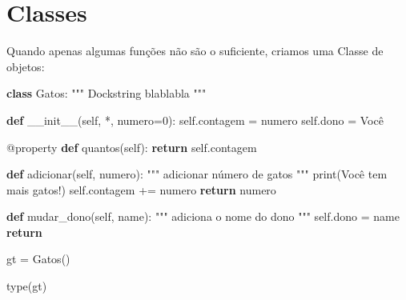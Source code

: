 \documentclass[
  letterpaper,
  DIV=11,
  numbers=noendperiod]{scrreprt}
\newenvironment{Shaded}{\begin{snugshade}}{\end{snugshade}}
\newcommand{\AttributeTok}[1]{\textcolor[rgb]{0.40,0.45,0.13}{#1}}
\newcommand{\BuiltInTok}[1]{\textcolor[rgb]{0.00,0.23,0.31}{#1}}
\newcommand{\CommentTok}[1]{\textcolor[rgb]{0.37,0.37,0.37}{#1}}
\newcommand{\ControlFlowTok}[1]{\textcolor[rgb]{0.00,0.23,0.31}{\textbf{#1}}}
\newcommand{\DecValTok}[1]{\textcolor[rgb]{0.68,0.00,0.00}{#1}}
\newcommand{\FunctionTok}[1]{\textcolor[rgb]{0.28,0.35,0.67}{#1}}
\newcommand{\KeywordTok}[1]{\textcolor[rgb]{0.00,0.23,0.31}{\textbf{#1}}}
\newcommand{\NormalTok}[1]{\textcolor[rgb]{0.00,0.23,0.31}{#1}}
\newcommand{\OperatorTok}[1]{\textcolor[rgb]{0.37,0.37,0.37}{#1}}
\newcommand{\StringTok}[1]{\textcolor[rgb]{0.13,0.47,0.30}{#1}}
\newcommand{\VariableTok}[1]{\textcolor[rgb]{0.07,0.07,0.07}{#1}}
\begin{document}
\section{Classes}\label{classes}

Quando apenas algumas funções não são o suficiente, criamos uma Classe
de objetos:

\begin{Shaded}
\begin{Highlighting}[]
\KeywordTok{class}\NormalTok{ Gatos:}
    \CommentTok{""" }
\CommentTok{    Dockstring blablabla}
\CommentTok{    """}

    \KeywordTok{def} \FunctionTok{\_\_init\_\_}\NormalTok{(}\VariableTok{self}\NormalTok{, }\OperatorTok{*}\NormalTok{, numero}\OperatorTok{=}\DecValTok{0}\NormalTok{):}
        \VariableTok{self}\NormalTok{.contagem }\OperatorTok{=}\NormalTok{ numero}
        \VariableTok{self}\NormalTok{.dono }\OperatorTok{=} \StringTok{\textquotesingle{}Você\textquotesingle{}}

    \AttributeTok{@property}
    \KeywordTok{def}\NormalTok{ quantos(}\VariableTok{self}\NormalTok{):}
        \ControlFlowTok{return} \VariableTok{self}\NormalTok{.contagem}

    \KeywordTok{def}\NormalTok{ adicionar(}\VariableTok{self}\NormalTok{, numero):}
        \CommentTok{"""}
\CommentTok{        adicionar número de gatos}
\CommentTok{        """}
        \BuiltInTok{print}\NormalTok{(}\StringTok{\textquotesingle{}Você tem mais gatos!\textquotesingle{}}\NormalTok{)}
        \VariableTok{self}\NormalTok{.contagem }\OperatorTok{+=}\NormalTok{ numero}
        \ControlFlowTok{return}\NormalTok{ numero}

    \KeywordTok{def}\NormalTok{ mudar\_dono(}\VariableTok{self}\NormalTok{, name):}
        \CommentTok{"""}
\CommentTok{        adiciona o nome do dono}
\CommentTok{        """}
        \VariableTok{self}\NormalTok{.dono }\OperatorTok{=}\NormalTok{ name}
        \ControlFlowTok{return}
\end{Highlighting}
\end{Shaded}

\begin{Shaded}
\begin{Highlighting}[]
\NormalTok{gt }\OperatorTok{=}\NormalTok{ Gatos()}
\end{Highlighting}
\end{Shaded}

\begin{Shaded}
\begin{Highlighting}[]
\BuiltInTok{type}\NormalTok{(gt)}
\end{Highlighting}
\end{Shaded}
\end{document}
